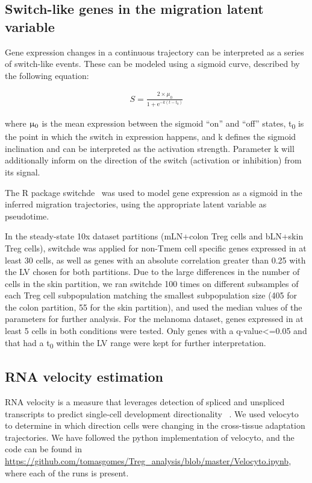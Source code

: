 
\subsection{Switch-like genes in the migration latent variable}
Gene expression changes in a continuous trajectory can be interpreted as a series of switch-like events. These can be modeled using a sigmoid curve, described by the following equation:

\begin{align}
S = \frac{2 \times \mu_0}{1 + \mathrm{e}^{-k(t - t_0)}}
\end{align}

where ${\upmu\textsubscript{0}}$ is the mean expression between the sigmoid “on” and “off” states, t\textsubscript{0} is the point in which the switch in expression happens, and k defines the sigmoid inclination and can be interpreted as the activation strength. Parameter k will additionally inform on the direction of the switch (activation or inhibition) from its signal.

The R package switchde~\citep{Campbell2017-cf} was used to model gene expression as a sigmoid in the inferred migration trajectories, using the appropriate latent variable as pseudotime. 

In the steady-state 10x dataset partitions (mLN+colon Treg cells and bLN+skin Treg cells), switchde was applied for non-Tmem cell specific genes expressed in at least 30 cells, as well as genes with an absolute correlation greater than 0.25 with the LV chosen for both partitions. Due to the large differences in the number of cells in the skin partition, we ran switchde 100 times on different subsamples of each Treg cell subpopulation matching the smallest subpopulation size (405 for the colon partition, 55 for the skin partition), and used the median values of the parameters for further analysis. For the melanoma dataset, genes expressed in at least 5 cells in both conditions were tested. Only genes with a q-value<=0.05 and that had a t\textsubscript{0} within the LV range were kept for further interpretation.

\subsection{RNA velocity estimation}
RNA velocity is a measure that leverages detection of spliced and unspliced transcripts to predict single-cell development directionality ~\citep{manno_rna_2018}. We used velocyto to determine in which direction cells were changing in the cross-tissue adaptation trajectories. We have followed the python implementation of velocyto, and the code can be found in \url{https://github.com/tomasgomes/Treg\_analysis/blob/master/Velocyto.ipynb}, where each of the runs is present.

